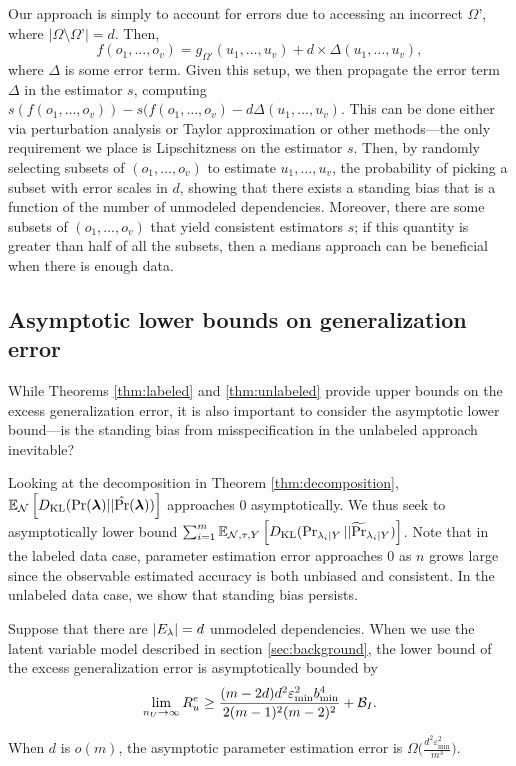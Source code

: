 Our approach is simply to account for errors due to accessing an incorrect $\Omega’$, where $|\Omega \setminus \Omega’| = d$. Then, 
\[ f(o_1, \ldots, o_v) = g_{\Omega'}(u_1, \ldots, u_v) + d \times \Delta(u_1, \ldots, u_v),\]
where $\Delta$ is some error term. Given this setup, we then propagate the error term $\Delta$ in the estimator $s$, computing
$s(f(o_1, \ldots, o_v)) - s(f(o_1, \ldots, o_v) - d \Delta(u_1, \ldots, u_v)$. This can be done either via perturbation analysis or Taylor approximation or other methods---the only requirement we place is Lipschitzness on the estimator $s$. Then, by randomly selecting subsets of $(o_1, \ldots, o_v)$ to estimate $u_1, \ldots, u_v$, the probability of picking a subset with error scales in $d$, showing that there exists a standing bias that is a function of the number of unmodeled dependencies. Moreover, there are some subsets of $(o_1, \ldots, o_v)$ that yield consistent estimators $s$; if this quantity is greater than half of all the subsets, then a medians approach can be beneficial when there is enough data.


\subsection{Asymptotic lower bounds on generalization error}

While Theorems \ref{thm:labeled} and \ref{thm:unlabeled} provide upper bounds on the excess generalization error, it is also important to consider the asymptotic lower bound---is the standing bias from misspecification in the unlabeled approach inevitable? 

Looking at the decomposition in Theorem \ref{thm:decomposition}, $\mathbb{E}_{\mathcal{N}}\left[D_{\mathrm{KL}}(\Pr(\bm{\lambda}) || \hat{\Pr}(\bm{\lambda}))\right]$ approaches $0$ asymptotically. We thus seek to asymptotically lower bound $\sum_{i = 1}^m \mathbb{E}_{\mathcal{N}, \tau, Y}\left[D_{\mathrm{KL}}( \Pr_{\lambda_i | Y} || \widetilde{\Pr}_{\lambda_i | Y})\right]$. Note that in the labeled data case, parameter estimation error approaches $0$ as $n$ grows large since the observable estimated accuracy is both unbiased and consistent. In the unlabeled data case, we show that standing bias persists.

\begin{theorem}
Suppose that there are $|E_{\lambda}| = d$ unmodeled dependencies. When we use the latent variable model described in section \ref{sec:background}, the lower bound of the excess generalization error is asymptotically bounded by
\begin{align}
    \lim_{n_U \rightarrow \infty} R_u^e \ge \frac{(m - 2d) d^2 \varepsilon_{\min}^2 b_{\min}^4}{2(m - 1)^2 (m - 2)^2} + \mathcal{B}_I.
\end{align}

When $d$ is $o(m)$, the asymptotic parameter estimation error is $\Omega \Big(\frac{d^2 \varepsilon_{\min}^2}{m^3} \Big)$.
\end{theorem}

